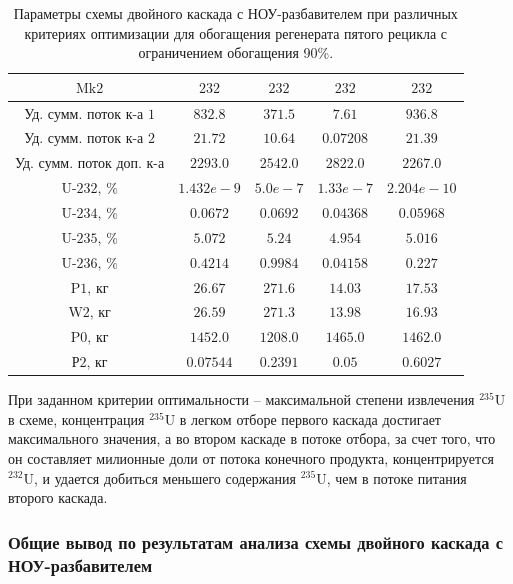 \begin{table}
\begin{tabular}{ccccc}
        $\text{Mk2}$ & $232$ & $232$ & $232$ & $232$\\ \hline
        $\text{Уд. сумм. поток к-а 1}$ & $832.8$ & $371.5$ & $7.61$ & $936.8$\\ \hline
        $\text{Уд. сумм. поток к-а 2}$ & $21.72$ & $10.64$ & $0.07208$ & $21.39$\\ \hline
        $\text{Уд. сумм. поток доп. к-а}$ & $2293.0$ & $2542.0$ & $2822.0$ & $2267.0$\\ \hline
        $\text{U-232, \%}$ & $1.432e-9$ & $5.0e-7$ & $1.33e-7$ & $2.204e-10$\\ \hline
        $\text{U-234, \%}$ & $0.0672$ & $0.0692$ & $0.04368$ & $0.05968$\\ \hline
        $\text{U-235, \%}$ & $5.072$ & $5.24$ & $4.954$ & $5.016$\\ \hline
        $\text{U-236, \%}$ & $0.4214$ & $0.9984$ & $0.04158$ & $0.227$\\ \hline
        $\text{P1, кг}$ & $26.67$ & $271.6$ & $14.03$ & $17.53$\\ \hline
        $\text{W2, кг}$ & $26.59$ & $271.3$ & $13.98$ & $16.93$\\ \hline
        $\text{P0, кг}$ & $1452.0$ & $1208.0$ & $1465.0$ & $1462.0$\\ \hline
        $\text{Р2, кг}$ & $0.07544$ & $0.2391$ & $0.05$ & $0.6027$\\ \hline
    \end{tabular}                       
\caption{Параметры схемы двойного каскада с НОУ-разбавителем при различных критериях оптимизации для обогащения регенерата пятого рецикла с ограничением обогащения 90\%.{\label{2opt5_90}}}
\end{table}






При заданном критерии оптимальности -- максимальной степени извлечения $^{235}$U в схеме, концентрация $^{235}$U в легком отборе первого каскада достигает максимального значения, а во втором каскаде в потоке отбора, за счет того, что он составляет милионные доли от потока конечного продукта, концентрируется $^{232}$U, и удается добиться меньшего содержания $^{235}$U, чем в потоке питания второго каскада.

\subsubsection{Общие вывод по результатам анализа схемы двойного каскада с НОУ-разбавителем}



